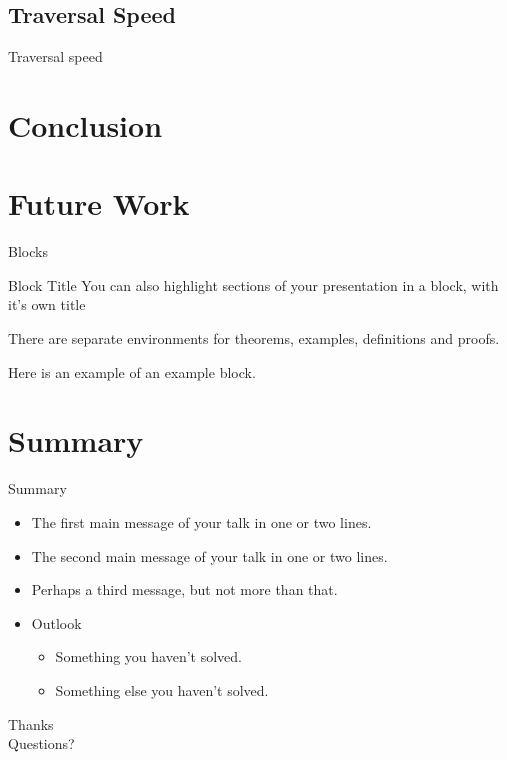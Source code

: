 \documentclass{beamer}
\begin{document}
\subsection{Traversal Speed}
\begin{frame}{Traversal speed}

\end{frame}

\section{Conclusion}
\section{Future Work}

\begin{frame}{Blocks}
\begin{block}{Block Title}
You can also highlight sections of your presentation in a block, with it's own title
\end{block}
\begin{theorem}
There are separate environments for theorems, examples, definitions and proofs.
\end{theorem}
\begin{example}
Here is an example of an example block.
\end{example}
\end{frame}

\section*{Summary}

\begin{frame}{Summary}
  \begin{itemize}
  \item
    The \alert{first main message} of your talk in one or two lines.
  \item
    The \alert{second main message} of your talk in one or two lines.
  \item
    Perhaps a \alert{third message}, but not more than that.
  \end{itemize}
  
  \begin{itemize}
  \item
    Outlook
    \begin{itemize}
    \item
      Something you haven't solved.
    \item
      Something else you haven't solved.
    \end{itemize}
  \end{itemize}
\end{frame}

\begin{frame}
\begin{center}
\Huge{Thanks}\\


\LARGE{Questions?}
\end{center}
\end{frame}
\end{document}
